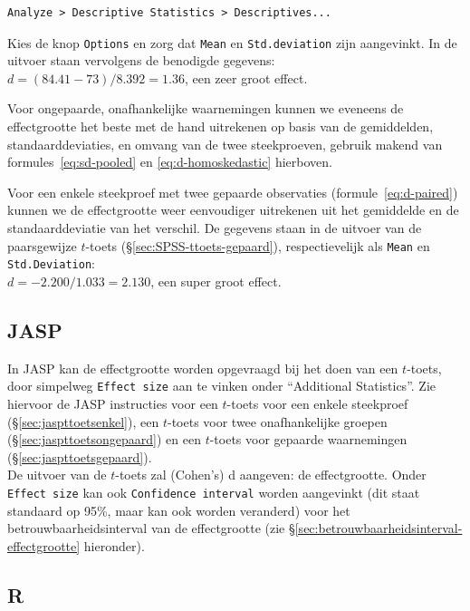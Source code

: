 \documentclass[
]{book}
\begin{document}
\begin{verbatim}
Analyze > Descriptive Statistics > Descriptives...
\end{verbatim}

Kies de knop \texttt{Options} en zorg dat \texttt{Mean} en \texttt{Std.deviation} zijn
aangevinkt. In de uitvoer staan vervolgens de benodigde gegevens:\\
\(d = (84.41 - 73) / 8.392 = 1.36\), een zeer groot effect.

Voor ongepaarde, onafhankelijke waarnemingen kunnen we eveneens de
effectgrootte het beste met de hand uitrekenen op basis van de
gemiddelden, standaarddeviaties, en omvang van de twee steekproeven,
gebruik makend van formules~\eqref{eq:sd-pooled} en
\eqref{eq:d-homoskedastic} hierboven.

Voor een enkele steekproef met twee gepaarde observaties
(formule~\eqref{eq:d-paired}) kunnen we de effectgrootte weer eenvoudiger
uitrekenen uit het gemiddelde en de standaarddeviatie van het verschil.
De gegevens staan in de uitvoer van de paarsgewijze \(t\)-toets
(§\ref{sec:SPSS-ttoets-gepaard}), respectievelijk als \texttt{Mean} en
\texttt{Std.Deviation}:\\
\(d = -2.200 / 1.033 = 2.130\), een super groot effect.

\subsection{JASP}\label{jasp-13}

In JASP kan de effectgrootte worden opgevraagd bij het doen van een
\(t\)-toets, door simpelweg \texttt{Effect\ size} aan te vinken onder ``Additional
Statistics''. Zie hiervoor de JASP instructies voor een \(t\)-toets voor
een enkele steekproef (§\ref{sec:jaspttoetsenkel}), een \(t\)-toets voor
twee onafhankelijke groepen (§\ref{sec:jaspttoetsongepaard}) en een
\(t\)-toets voor gepaarde waarnemingen (§\ref{sec:jaspttoetsgepaard}).\\
De uitvoer van de \(t\)-toets zal (Cohen's) d aangeven: de effectgrootte.
Onder \texttt{Effect\ size} kan ook \texttt{Confidence\ interval} worden aangevinkt (dit
staat standaard op 95\%, maar kan ook worden veranderd) voor het
betrouwbaarheidsinterval van de effectgrootte (zie
§\ref{sec:betrouwbaarheidsinterval-effectgrootte} hieronder).

\subsection{R}\label{r-14}
\end{document}
